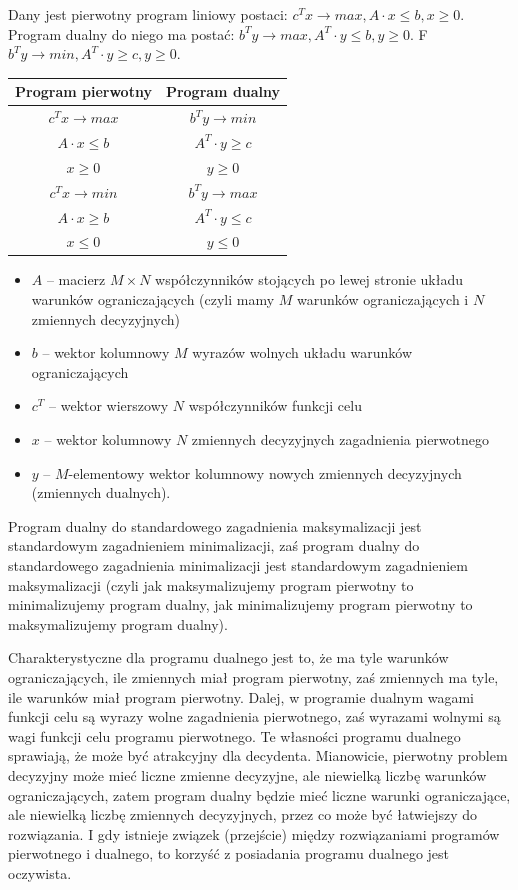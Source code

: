 \answer
{Dany jest pierwotny program liniowy postaci:
$c^T x \to max, A \cdot x \leq b, x \geq 0.$
Program dualny do niego ma postać:}
{$b^T y \to max, A^T \cdot y \leq b, y \geq 0.$}
{F}
{$b^T y \to min, A^T \cdot y \geq c, y \geq 0.$}
{
\begin{center}
\begin{tabular}{c | c}
Program pierwotny  & Program dualny       \\ 
\hline \hline
$c^Tx \to max$     & $b^T y \to min$      \\
$A \cdot x \leq b$ & $A^T \cdot y \geq c$ \\
$x \geq 0$         & $y \geq 0$           \\ 
\hline
$c^Tx \to min$     & $b^T y \to max$      \\
$A \cdot x \geq b$ & $A^T \cdot y \leq c$ \\
$x \leq 0$         & $y \leq 0$           \\
\end{tabular}
\end{center}

\begin{itemize}
\item $A$ -- macierz $M\times N$ współczynników stojących po lewej stronie układu warunków ograniczających (czyli mamy $M$ warunków ograniczających i $N$ zmiennych decyzyjnych)
\item $b$ -- wektor kolumnowy $M$ wyrazów wolnych układu warunków ograniczających 
\item $c^T$ -- wektor wierszowy $N$ współczynników funkcji celu
\item $x$ -- wektor kolumnowy $N$ zmiennych decyzyjnych zagadnienia pierwotnego
\item $y$ -- $M$-elementowy wektor kolumnowy nowych zmiennych decyzyjnych (zmiennych dualnych).
\end{itemize}

Program dualny do standardowego zagadnienia maksymalizacji jest standardowym zagadnieniem minimalizacji, zaś program dualny do standardowego zagadnienia minimalizacji jest standardowym zagadnieniem maksymalizacji (czyli jak maksymalizujemy program pierwotny to minimalizujemy program dualny, jak minimalizujemy program pierwotny to maksymalizujemy program dualny).

Charakterystyczne dla programu dualnego jest to, że ma tyle warunków ograniczających, ile zmiennych miał program pierwotny, zaś zmiennych ma tyle, ile warunków miał program pierwotny. Dalej, w programie dualnym wagami funkcji celu są wyrazy wolne zagadnienia pierwotnego, zaś wyrazami wolnymi są wagi funkcji celu programu pierwotnego. Te własności programu dualnego sprawiają, że może być atrakcyjny dla decydenta. Mianowicie, pierwotny problem decyzyjny może mieć liczne zmienne decyzyjne, ale niewielką liczbę warunków ograniczających, zatem program dualny będzie mieć liczne warunki ograniczające, ale niewielką liczbę zmiennych decyzyjnych, przez co może być łatwiejszy do rozwiązania. I gdy istnieje związek (przejście) między rozwiązaniami programów pierwotnego i dualnego, to korzyść z posiadania programu dualnego jest oczywista.
}




